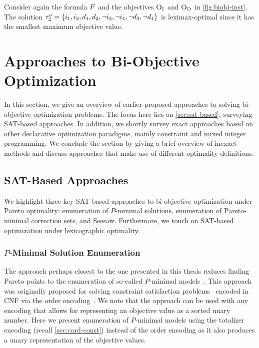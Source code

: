 \begin{example}
  Consider again the formula $F$ and the objectives $\textsc{O}_{\text{I}}$ and $\textsc{O}_{\text{D}}$ in \cref{fig:biobj-inst}.
  The solution $\tau^o_2 = \{i_1,\allowbreak i_2,\allowbreak d_1,\allowbreak d_2,\allowbreak \lnot i_3,\allowbreak \lnot i_4,\allowbreak \lnot d_3,\allowbreak \lnot d_4\}$ is leximax-optimal since it has the smallest maximum objective value.
\end{example}

\section{Approaches to Bi-Objective Optimization\label{sec:approaches}}

In this section, we give an overview of earlier-proposed approaches to solving bi-objective optimization problems.
The focus here lies on \cref{sec:sat-based}, surveying SAT-based approaches.
In addition, we shortly survey exact approaches based on other declarative optimization paradigms, mainly constraint and mixed integer programming.
We conclude the section by giving a brief overview of inexact methods and discuss approaches that make use of different optimality definitions.

\subsection{SAT-Based Approaches\label{sec:sat-based}}

We highlight three key SAT-based approaches to bi-objective optimization under Pareto optimality:
enumeration of $P$-minimal solutions, enumeration of Pareto-minimal correction sets, and Seesaw.
Furthermore, we touch on SAT-based optimization under lexicographic optimality.

\subsubsection{$P$-Minimal Solution Enumeration\label{sec:p-minimal}}

The approach perhaps closest to the one presented in this thesis reduces finding Pareto points to the enumeration of so-called $P$-minimal models~\autocites{DBLP:conf/cp/SohBTB17,DBLP:conf/ftp/KoshimuraNFH09}.
This approach was originally proposed for solving constraint satisfaction problems~\autocites{DBLP:reference/fai/2} encoded in CNF via the order encoding~\autocite{DBLP:conf/ictai/TamuraBS13}.
We note that the approach can be used with any encoding that allows for representing an objective value as a sorted unary number.
Here we present enumeration of $P$-minimal models using the totalizer encoding (recall \cref{sec:card-const}) instead of the order encoding as it also produces a unary representation of the objective values.

